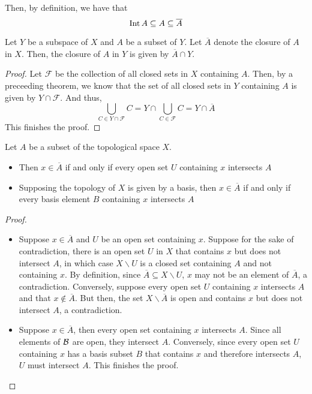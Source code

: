 Then, by definition, we have that 
\begin{equation*}
    \operatorname{Int} A\subseteq A\subseteq\overline{A}
\end{equation*}

\begin{theorem}
    Let $Y$ be a subspace of $X$ and $A$ be a subset of $Y$. Let $\overline{A}$ denote the closure of $A$ in $X$. Then, the closure of $A$ in $Y$ is given by $\overline{A}\cap Y$.
\end{theorem}
\begin{proof}
    Let $\mathcal{F}$ be the collection of all closed sets in $X$ containing $A$. Then, by a preceeding theorem, we know that the set of all closed sets in $Y$ containing $A$ is given by $Y\cap\mathcal{F}$. And thus, 
    \begin{equation*}
        \bigcup_{C\in Y\cap\mathcal{F}} C = Y\cap\bigcup_{C\in\mathcal{F}}C = Y\cap\overline{A}
    \end{equation*}
    This finishes the proof.
\end{proof}

\begin{theorem}
    Let $A$ be a subset of the topological space $X$.
    \begin{itemize}
        \item Then $x\in\overline{A}$ if and only if every open set $U$ containing $x$ intersects $A$ 
        \item Supposing the topology of $X$ is given by a basis, then $x\in\overline{A}$ if and only if every basis element $B$ containing $x$ intersects $A$
    \end{itemize}
\end{theorem}
\begin{proof}
    \hfill 
    \begin{itemize}
        \item Suppose $x\in\overline{A}$ and $U$ be an open set containing $x$. Suppose for the sake of contradiction, there is an open set $U$ in $X$ that contains $x$ but does not intersect $A$, in which case $X\backslash U$ is a closed set containing $A$ and not containing $x$. By definition, since $\overline{A}\subseteq X\backslash U$, $x$ may not be an element of $\overline{A}$, a contradiction. Conversely, suppose every open set $U$ containing $x$ intersects $A$ and that $x\notin\overline{A}$. But then, the set $X\backslash\overline{A}$ is open and contains $x$ but does not intersect $A$, a contradiction.
        \item Suppose $x\in\overline{A}$, then every open set containing $x$ intersects $A$. Since all elements of $\mathcal{B}$ are open, they intersect $A$. Conversely, since every open set $U$ containing $x$ has a basis subset $B$ that contains $x$ and therefore intersects $A$, $U$ must intersect $A$. This finishes the proof.
    \end{itemize}
\end{proof}

